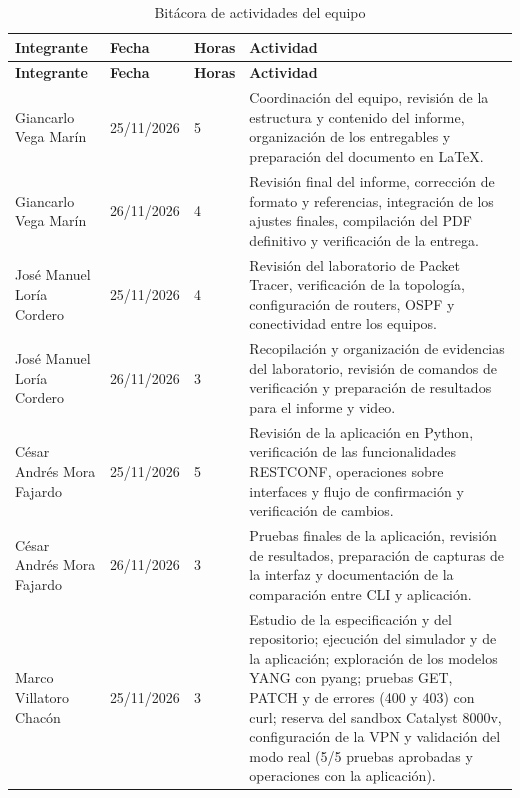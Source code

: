 \begin{longtable}{p{3.4cm}p{2.0cm}p{1.4cm}p{6.6cm}}
\caption{Bitácora de actividades del equipo} \\
\toprule
\textbf{Integrante} & \textbf{Fecha} & \textbf{Horas} &
\textbf{Actividad} \\
\midrule
\endfirsthead

\toprule
\textbf{Integrante} & \textbf{Fecha} & \textbf{Horas} &
\textbf{Actividad} \\
\midrule
\endhead

Giancarlo Vega Marín &
25/11/2026 & 5 &
Coordinación del equipo, revisión de la estructura y contenido del informe,
organización de los entregables y preparación del documento en LaTeX. \\

Giancarlo Vega Marín &
26/11/2026 & 4 &
Revisión final del informe, corrección de formato y referencias, integración
de los ajustes finales, compilación del PDF definitivo y verificación de la entrega. \\

José Manuel Loría Cordero &
25/11/2026 & 4 &
Revisión del laboratorio de Packet Tracer, verificación de la topología,
configuración de routers, OSPF y conectividad entre los equipos. \\

José Manuel Loría Cordero &
26/11/2026 & 3 &
Recopilación y organización de evidencias del laboratorio, revisión de
comandos de verificación y preparación de resultados para el informe y video. \\

César Andrés Mora Fajardo &
25/11/2026 & 5 &
Revisión de la aplicación en Python, verificación de las funcionalidades
RESTCONF, operaciones sobre interfaces y flujo de confirmación y verificación
de cambios. \\

César Andrés Mora Fajardo &
26/11/2026 & 3 &
Pruebas finales de la aplicación, revisión de resultados, preparación de
capturas de la interfaz y documentación de la comparación entre CLI y aplicación. \\

Marco Villatoro Chacón &
25/11/2026 & 3 &
Estudio de la especificación y del repositorio; ejecución del simulador y
de la aplicación; exploración de los modelos YANG con pyang; pruebas GET,
PATCH y de errores (400 y 403) con curl; reserva del sandbox Catalyst 8000v,
configuración de la VPN y validación del modo real (5/5 pruebas aprobadas y
operaciones con la aplicación). \\


\end{longtable}
